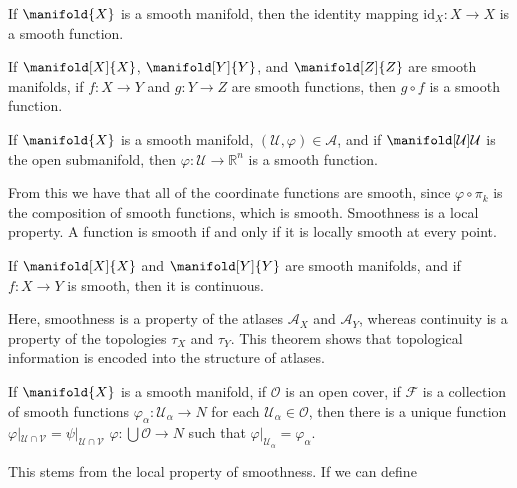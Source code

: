         \begin{theorem}
            If $\manifold{X}$ is a smooth manifold, then the identity
            mapping $\textrm{id}_{X}:X\rightarrow{X}$ is a smooth function.
        \end{theorem}
        \begin{theorem}
            If $\manifold[X]{X}$, $\manifold[Y]{Y}$, and $\manifold[Z]{Z}$
            are smooth manifolds, if $f:X\rightarrow{Y}$ and
            $g:Y\rightarrow{Z}$ are smooth functions, then $g\circ{f}$ is a
            smooth function.
        \end{theorem}
        \begin{theorem}
            If $\manifold{X}$ is a smooth manifold,
            $(\mathcal{U},\varphi)\in\mathcal{A}$, and if
            $\manifold[\mathcal{U}]{\mathcal{U}}$ is the open submanifold,
            then $\varphi:\mathcal{U}\rightarrow\mathbb{R}^{n}$ is a smooth
            function.
        \end{theorem}
        From this we have that all of the coordinate functions are smooth,
        since $\varphi\circ\pi_{k}$ is the composition of smooth functions,
        which is smooth. Smoothness is a local property. A function is
        smooth if and only if it is locally smooth at every point.
        \begin{theorem}
            If $\manifold[X]{X}$ and $\manifold[Y]{Y}$ are smooth manifolds,
            and if $f:X\rightarrow{Y}$ is smooth, then it is continuous.
        \end{theorem}
        Here, smoothness is a property of the atlases $\mathcal{A}_{X}$ and
        $\mathcal{A}_{Y}$, whereas continuity is a property of the
        topologies $\tau_{X}$ and $\tau_{Y}$. This theorem shows that
        topological information is encoded into the structure of atlases.
        \begin{theorem}
            If $\manifold{X}$ is a smooth manifold, if $\mathcal{O}$ is an
            open cover, if $\mathcal{F}$ is a collection of smooth functions
            $\varphi_{\alpha}:\mathcal{U}_{\alpha}\rightarrow{N}$ for each
            $\mathcal{U}_{\alpha}\in\mathcal{O}$, then there is a unique
            function $\varphi|_{\mathcal{U}\cap\mathcal{V}}=%
            \psi|_{\mathcal{U}\cap\mathcal{V}}$
            $\varphi:\bigcup\mathcal{O}\rightarrow{N}$ such that
            $\varphi|_{\mathcal{U}_{\alpha}}=\varphi_{\alpha}$.
        \end{theorem}
        This stems from the local property of smoothness. If we can define
